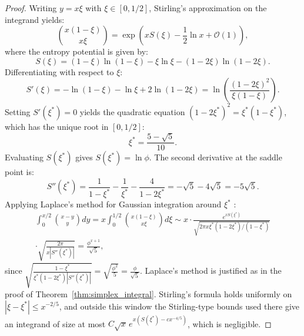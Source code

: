\documentclass[11pt,a4paper]{article}
\theoremstyle{plain}
\theoremstyle{definition}
\theoremstyle{remark}
\numberwithin{equation}{section}
\begin{document}
\begin{proof}
Writing $y = x\xi$ with $\xi \in [0, 1/2]$, Stirling's approximation on the integrand yields:
\begin{equation}
\binom{x(1-\xi)}{x\xi} = \exp\left(x S(\xi) - \frac{1}{2}\ln x + \mathcal{O}(1)\right),
\end{equation}
where the entropy potential is given by:
\begin{equation}
S(\xi) = (1-\xi)\ln(1-\xi) - \xi\ln\xi - (1-2\xi)\ln(1-2\xi).
\end{equation}
Differentiating with respect to $\xi$:
\begin{equation}
S'(\xi) = -\ln(1-\xi) - \ln\xi + 2\ln(1-2\xi) = \ln\left(\frac{(1-2\xi)^2}{\xi(1-\xi)}\right).
\end{equation}
Setting $S'(\xi^*) = 0$ yields the quadratic equation $(1-2\xi^*)^2 = \xi^*(1-\xi^*)$, which has the unique root in $[0, 1/2]$:
\begin{equation}
\xi^* = \frac{5 - \sqrt{5}}{10}.
\end{equation}
Evaluating $S(\xi^*)$ gives $S(\xi^*) = \ln\phi$. The second derivative at the saddle point is:
\begin{equation}
S''(\xi^*) = \frac{1}{1-\xi^*} - \frac{1}{\xi^*} - \frac{4}{1-2\xi^*} = -\sqrt{5} - 4\sqrt{5} = -5\sqrt{5}.
\end{equation}
Applying Laplace's method for Gaussian integration around $\xi^*$ \cite{olver1997, wong2001}:
\begin{multline}
\int_0^{x/2} \binom{x-y}{y}dy = x \int_0^{1/2} \binom{x(1-\xi)}{x\xi}d\xi \sim x \cdot \frac{e^{x S(\xi^*)}}{\sqrt{2\pi x \xi^*(1-2\xi^*)/(1-\xi^*)}} \\
\cdot \sqrt{\frac{2\pi}{x |S''(\xi^*)|}} = \frac{\phi^{x+1}}{\sqrt{5}},
\end{multline}
since $\sqrt{\frac{1-\xi^*}{\xi^*(1-2\xi^*) |S''(\xi^*)|}} = \sqrt{\frac{\phi^2}{5}} = \frac{\phi}{\sqrt{5}}$. Laplace's method is justified as in the proof of Theorem~\ref{thm:simplex_integral}. Stirling's formula holds uniformly on $|\xi - \xi^*| \le x^{-2/5}$, and outside this window the Stirling-type bounds used there give an integrand of size at most $C\sqrt{x}\,e^{x(S(\xi^*) - c x^{-4/5})}$, which is negligible.


\end{proof}
\end{document}
